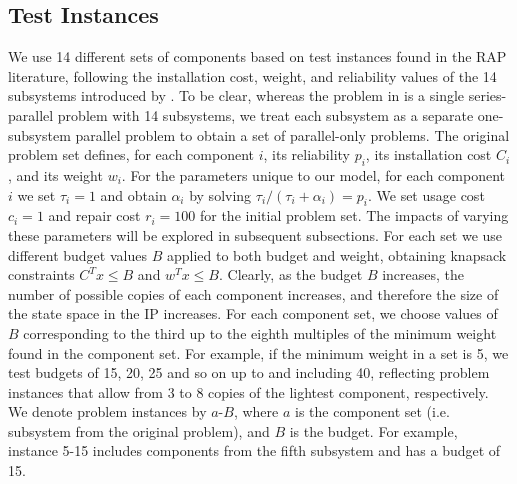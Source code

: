 \documentclass[11pt,authoryear,a4paper]{article}
\theoremstyle{definition}
\begin{document}
{\subsection{Test Instances}
\label{paper1:study:instances}
We use 14 different sets of components based on test instances found in the RAP literature, following the installation cost, weight, and reliability values of the 14 subsystems introduced by \cite{fyffe1968problemset}. To be clear, whereas the problem in \cite{fyffe1968problemset} is a single series-parallel problem with 14 subsystems, we treat each subsystem as a separate one-subsystem parallel problem to obtain a set of parallel-only problems. The original problem set defines, for each component $i$, its reliability $p_i$, its installation cost $C_i$, and its weight $w_i$. For the parameters unique to our model, for each component $i$ we set $\tau_i = 1$ and obtain $\alpha_i$ by solving $\tau_i/(\tau_i + \alpha_i) = p_i$. We set usage cost $c_i = 1$ and repair cost $r_i = 100$ for the initial problem set. The impacts of varying these parameters will be explored in subsequent subsections. For each set we use different budget values $B$ applied to both budget and weight, obtaining knapsack constraints $C^Tx\leq B$ and $w^Tx\leq B$. Clearly, as the budget $B$ increases, the number of possible copies of each component increases, and therefore the size of the state space in the IP increases. For each component set, we choose values of $B$ corresponding to the third up to the eighth multiples of the minimum weight found in the component set. For example, if the minimum weight in a set is 5, we test budgets of 15, 20, 25 and so on up to and including 40, reflecting problem instances that allow from 3 to 8 copies of the lightest component, respectively. We denote problem instances by $a$-$B$, where $a$ is the component set (i.e. subsystem from the original problem), and $B$ is the budget. For example, instance 5-15 includes components from the fifth subsystem and has a budget of 15. }
\end{document}
